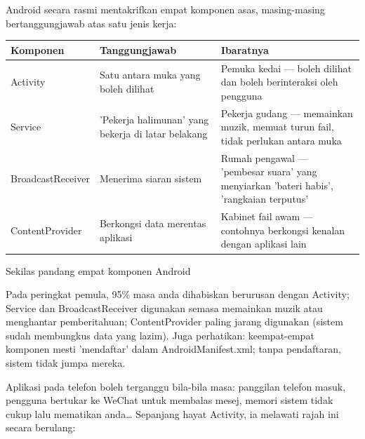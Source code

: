


Android secara rasmi mentakrifkan empat komponen asas, masing-masing bertanggungjawab atas satu jenis kerja:

\begin{center}
\begin{tabularx}{\linewidth}{|X|X|X|}
\hline
\textbf{Komponen} & \textbf{Tanggungjawab} & \textbf{Ibaratnya} \tabularnewline
\hline
Activity & Satu antara muka yang boleh dilihat & Pemuka kedai — boleh dilihat dan boleh berinteraksi oleh pengguna \tabularnewline
Service & 'Pekerja halimunan' yang bekerja di latar belakang & Pekerja gudang — memainkan muzik, memuat turun fail, tidak perlukan antara muka \tabularnewline
BroadcastReceiver & Menerima siaran sistem & Rumah pengawal — 'pembesar suara' yang menyiarkan 'bateri habis', 'rangkaian terputus' \tabularnewline
ContentProvider & Berkongsi data merentas aplikasi & Kabinet fail awam — contohnya berkongsi kenalan dengan aplikasi lain \tabularnewline
\hline
\end{tabularx}
\end{center}

\begin{center}\small\color{gray}Sekilas pandang empat komponen Android\end{center}

Pada peringkat pemula, 95\% masa anda dihabiskan berurusan dengan Activity; Service dan BroadcastReceiver digunakan semasa memainkan muzik atau menghantar pemberitahuan; ContentProvider paling jarang digunakan (sistem sudah membungkus data yang lazim). Juga perhatikan: keempat-empat komponen mesti 'mendaftar' dalam AndroidManifest.xml; tanpa pendaftaran, sistem tidak jumpa mereka.


Aplikasi pada telefon boleh terganggu bila-bila masa: panggilan telefon masuk, pengguna bertukar ke WeChat untuk membalas mesej, memori sistem tidak cukup lalu mematikan anda… Sepanjang hayat Activity, ia melawati rajah ini secara berulang:


